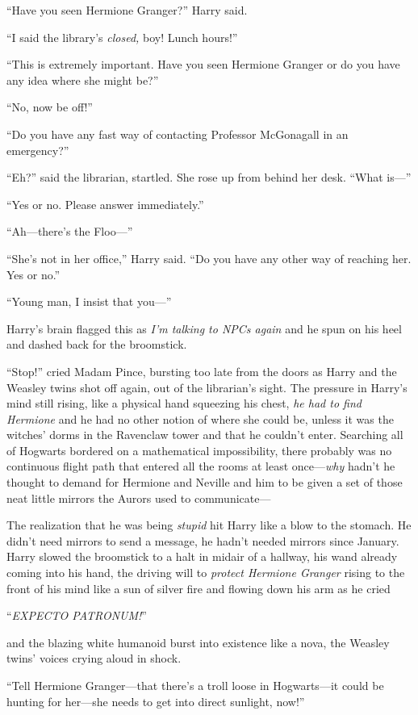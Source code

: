 “Have you seen Hermione Granger?” Harry said.

“I said the library’s \emph{closed,} boy! Lunch hours!”

“This is extremely important. Have you seen Hermione Granger or do you have any
idea where she might be?”

“No, now be off!”

“Do you have any fast way of contacting Professor McGonagall in an emergency?”

“Eh?” said the librarian, startled. She rose up from behind her desk. “What
is—”

“Yes or no. Please answer immediately.”

“Ah—there’s the Floo—”

“She’s not in her office,” Harry said. “Do you have any other way of reaching
her. Yes or no.”

“Young man, I insist that you—”

Harry’s brain flagged this as \emph{I’m talking to NPCs again} and he spun on
his heel and dashed back for the broomstick.

“Stop!” cried Madam Pince, bursting too late from the doors as Harry and the
Weasley twins shot off again, out of the librarian’s sight. The pressure in
Harry’s mind still rising, like a physical hand squeezing his chest, \emph{he
had to find Hermione} and he had no other notion of where she could be, unless
it was the witches’ dorms in the Ravenclaw tower and that he couldn’t enter.
Searching all of Hogwarts bordered on a mathematical impossibility, there
probably was no continuous flight path that entered all the rooms at least
once—\emph{why} hadn’t he thought to demand for Hermione and Neville and him
to be given a set of those neat little mirrors the Aurors used to communicate—

The realization that he was being \emph{stupid} hit Harry like a blow to the
stomach. He didn’t need mirrors to send a message, he hadn’t needed mirrors
since January. Harry slowed the broomstick to a halt in midair of a hallway,
his wand already coming into his hand, the driving will to \emph{protect
Hermione Granger} rising to the front of his mind like a sun of silver fire and
flowing down his arm as he cried

“\emph{EXPECTO PATRONUM!}”

and the blazing white humanoid burst into existence like a nova, the Weasley
twins’ voices crying aloud in shock.

“Tell Hermione Granger—that there’s a troll loose in Hogwarts—it could be
hunting for her—she needs to get into direct sunlight, now!”

